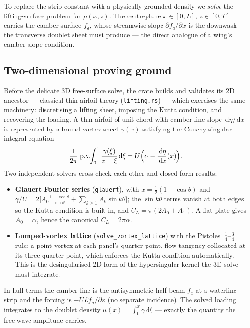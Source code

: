 \documentclass[11pt]{article}
\newcommand{\dd}{\,\mathrm{d}}
\begin{document}
To replace the strip constant with a physically grounded density we
\emph{solve} the lifting-surface problem for $\mu(x,z)$. The centreplane
$x\in[0,L]$, $z\in[0,T]$ carries the camber surface $f_a$, whose streamwise
slope $\partial f_a/\partial x$ is the downwash the transverse doublet sheet must
produce --- the direct analogue of a wing's camber-slope condition.

\subsection{Two-dimensional proving ground}
\label{sec:2d}

Before the delicate 3D free-surface solve, the crate builds and validates its
2D ancestor --- classical thin-airfoil theory (\texttt{lifting.rs}) --- which
exercises the same machinery: discretising a lifting sheet, imposing the Kutta
condition, and recovering the loading. A thin airfoil of unit chord with
camber-line slope $\dd\eta/\dd x$ is represented by a bound-vortex sheet
$\gamma(x)$ satisfying the Cauchy singular integral equation
\begin{equation}
  \frac{1}{2\pi}\;\text{p.v.}\!\!\int_0^1
    \frac{\gamma(\xi)}{x - \xi}\dd\xi
    = U\Bigl(\alpha - \frac{\dd\eta}{\dd x}(x)\Bigr).
\end{equation}
Two independent solvers cross-check each other and closed-form results:
\begin{itemize}
  \item \textbf{Glauert Fourier series} (\texttt{glauert}), with
        $x = \tfrac12(1-\cos\theta)$ and
        $\gamma/U = 2\bigl[A_0\frac{1+\cos\theta}{\sin\theta} +
        \sum_{k\ge1}A_k\sin k\theta\bigr]$; the $\sin k\theta$ terms vanish at
        both edges so the Kutta condition is built in, and
        $C_L = \pi(2A_0 + A_1)$. A flat plate gives $A_0 = \alpha$, hence the
        canonical $C_L = 2\pi\alpha$.
  \item \textbf{Lumped-vortex lattice} (\texttt{solve\_vortex\_lattice}) with
        the Pistolesi $\tfrac14$--$\tfrac34$ rule: a point vortex at each
        panel's quarter-point, flow tangency collocated at its three-quarter
        point, which enforces the Kutta condition automatically. This is the
        desingularised 2D form of the hypersingular kernel the 3D solve must
        integrate.
\end{itemize}
In hull terms the camber line is the antisymmetric half-beam $f_a$ at a
waterline strip and the forcing is $-U\,\partial f_a/\partial x$ (no separate
incidence). The solved loading integrates to the doublet density
$\mu(x) = \int_0^x \gamma\dd\xi$ --- exactly the quantity the free-wave
amplitude carries.
\end{document}
